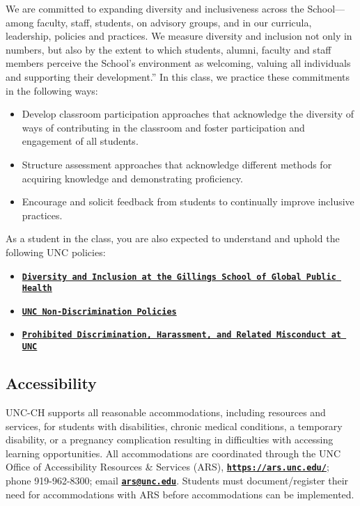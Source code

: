 \documentclass[11pt]{article}
\begin{document}
We are committed to expanding diversity and inclusiveness across the School—among faculty, staff, students, on advisory groups, and in our curricula, leadership, policies and practices. We measure diversity and inclusion not only in numbers, but also by the extent to which students, alumni, faculty and staff members perceive the School’s environment as welcoming, valuing all individuals and supporting their development.” In this class, we practice these commitments in the following ways: 
\begin{itemize}
\item Develop classroom participation approaches that acknowledge the 
diversity of ways of contributing in the classroom and foster 
participation and engagement of all students.
\item Structure assessment approaches that acknowledge different methods for acquiring knowledge and demonstrating proficiency.
\item Encourage and solicit feedback from students to continually improve inclusive practices. 
\end{itemize}
As a student in the class, you are also expected to understand and uphold the following UNC policies:
\begin{itemize}
\item \href{http://sph.unc.edu/resource-pages/diversity/}{\tt\bf Diversity and Inclusion at the Gillings School of Global Public Health}
\item \href{http://policy.sites.unc.edu/files/2013/04/nondiscrim.pdf}{\tt\bf UNC Non-Discrimination Policies}
\item \href{https://deanofstudents.unc.edu/incident-reporting/prohibited-harassmentsexual-misconduct}{\tt\bf Prohibited Discrimination, Harassment, and Related Misconduct at UNC}
\end{itemize}   

\subsection*{Accessibility}
UNC-CH supports all reasonable accommodations, including resources and
services, for students with disabilities, chronic medical conditions, a temporary disability, or a pregnancy complication resulting in difficulties with accessing learning opportunities.  All accommodations are coordinated through the UNC Office of Accessibility Resources \& Services (ARS), \href{https://ars.unc.edu/}{\tt\bf https://ars.unc.edu/}; phone 919-962-8300; email \href{ars@unc.edu}{\tt\bf ars@unc.edu}. Students must document/register their need for accommodations with ARS before accommodations can be implemented.
\end{document}

